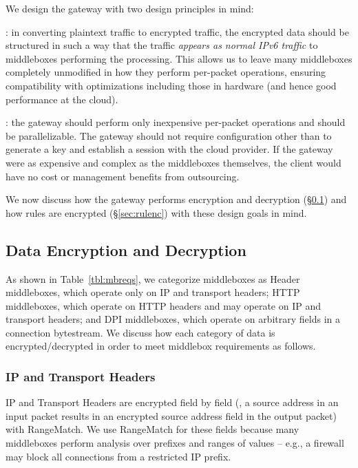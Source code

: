 We design the gateway with two design principles in mind: 

: in converting plaintext traffic to encrypted traffic, the encrypted data should be structured in such a way that the traffic {\it appears as normal IPv6 traffic} to middleboxes performing the processing. This allows us to leave many middleboxes completely unmodified in how they perform per-packet operations, ensuring compatibility with optimizations including those in hardware (and hence good performance at the cloud). 

: the gateway should perform only inexpensive per-packet operations and should be parallelizable. The gateway should not require configuration other than to generate a key and establish a session with the cloud provider. If the gateway were as expensive and complex as the middleboxes themselves, the client would have no cost or management benefits from outsourcing. 

We now discuss how the gateway performs encryption and decryption (\S\ref{sec:dataenc}) and how rules are encrypted (\S\ref{sec:rulenc}) with these design goals in mind.

\subsection{Data Encryption and Decryption}
\label{sec:dataenc}

As shown in Table~\ref{tbl:mbreqs}, we categorize middleboxes as Header middleboxes, which operate only on IP and transport headers; HTTP middleboxes, which operate on HTTP headers and may operate on IP and transport headers; and DPI middleboxes, which operate on arbitrary fields in a connection bytestream. 
We discuss how each category of data is encrypted/decrypted in order to meet middlebox requirements as follows.

\subsubsection{IP and Transport Headers}
IP and Transport Headers are encrypted field by field (\eg{}, a source address in an input packet results in an encrypted source address field in the output packet) with RangeMatch.
We use RangeMatch for these fields because many middleboxes perform analysis over prefixes and ranges of values -- e.g., a firewall may block all connections from a restricted IP prefix.

